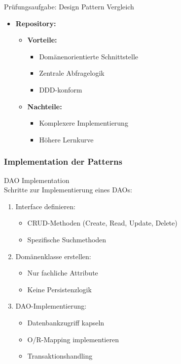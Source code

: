 \begin{example2}{Prüfungsaufgabe: Design Pattern Vergleich}
\begin{itemize}
    \item \textbf{Repository:}
    \begin{itemize}
        \item \textbf{Vorteile:}
        \begin{itemize}
            \item Domänenorientierte Schnittstelle
            \item Zentrale Abfragelogik
            \item DDD-konform
        \end{itemize}
        \item \textbf{Nachteile:}
        \begin{itemize}
            \item Komplexere Implementierung
            \item Höhere Lernkurve
        \end{itemize}
    \end{itemize}
\end{itemize}
\end{example2}

\subsubsection{Implementation der Patterns}

\begin{KR}{DAO Implementation}\\
Schritte zur Implementierung eines DAOs:
\begin{enumerate}
    \item Interface definieren:
    \begin{itemize}
        \item CRUD-Methoden (Create, Read, Update, Delete)
        \item Spezifische Suchmethoden
    \end{itemize}
    \item Domänenklasse erstellen:
    \begin{itemize}
        \item Nur fachliche Attribute
        \item Keine Persistenzlogik
    \end{itemize}
    \item DAO-Implementierung:
    \begin{itemize}
        \item Datenbankzugriff kapseln
        \item O/R-Mapping implementieren
        \item Transaktionshandling
    \end{itemize}
\end{enumerate}
\end{KR}



